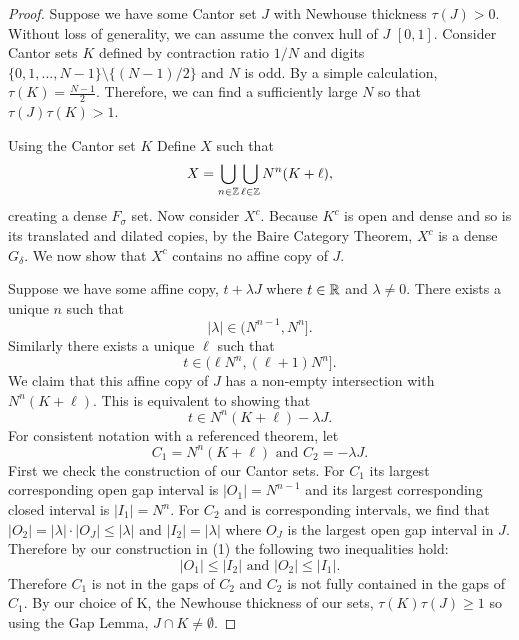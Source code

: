 \begin{proof} Suppose we have some Cantor set $J$ with Newhouse thickness $\tau(J) >0$. Without loss of generality, we  can assume  the convex hull of $J$ $[0,1]$.   Consider Cantor sets $K$ defined by contraction ratio $1/N$ and digits $\{0,1,...,N-1\}\setminus\{(N-1)/2\}$ and $N$ is odd. By a simple calculation,  $\tau (K) = \frac{N-1}{2}$. Therefore,  we can find a  sufficiently large $N$ so that $\tau(J)\tau(K)>1$. 

\medskip

Using the Cantor set $K$ Define $X$ such that $$
X = \bigcup_{n \in \mathbb{Z}} \bigcup_{\ell \in \mathbb{Z}} N^n(K+\ell),
$$creating a dense $F_\sigma$ set. Now consider $X^c$.  Because $K^c$ is open and dense and so is its translated and dilated copies, by the Baire Category Theorem, $X^c$ is a dense $G_{\delta}$.  We now show that $X^c$ contains no affine copy of $J$. 

\medskip

Suppose we have some affine copy, $t+ \lambda J$ where $t\in\mathbb{R}$ and $\lambda\ne 0$. There exists a unique $n$ such that 
\begin{equation}
    |\lambda| \in (N^{n-1}, N^n].
\end{equation}
Similarly there exists a unique $\ell$ such that 
\begin{equation}
t \in (\ell  N^n, (\ell+1)N^n].    
\end{equation}
We claim that this affine copy of $J$ has a non-empty intersection with $N^n(K+\ell)$.  This is equivalent to  showing that 
$$t \in N^n(K+\ell)-\lambda J.$$
For consistent notation with a referenced theorem, let 
$$C_1 = N^n(K+\ell) \text{ and } C_2 = - \lambda J.$$
First we check the construction of our Cantor sets. For $C_1$ its largest corresponding open gap interval is $|O_1| = N^{n-1}$ and its largest corresponding closed interval is $|I_1| = N^n$. For $C_2$ and is corresponding intervals, we find that $|O_2| =|\lambda|\cdot |O_J| \le |\lambda|$ and $|I_2| = |\lambda|$ where $O_J$ is the largest  open gap interval in $J$.  Therefore by our construction in (1) the following two inequalities hold: $$|O_1|\leq |I_2| \text { and } |O_2| \leq |I_1|.$$ Therefore $C_1$ is not in the gaps of $C_2$ and $C_2$ is not fully contained in the gaps of $C_1$.  By our choice of K, the Newhouse thickness of our sets, $\tau(K)\tau(J) \geq 1$ so using the Gap Lemma, $J \cap K \neq \emptyset$.  


\end{proof}
